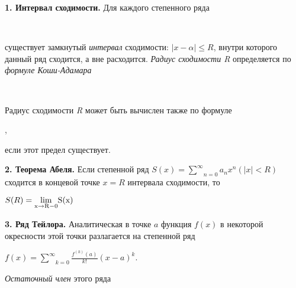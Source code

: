 \documentclass{book}
\begin{document}
\qquad \textbf {1. Интервал сходимости.} Для каждого степенного ряда\\

\begin{doublespace}
    \begin{centering} 
        \\
    \end{centering}
\end{doublespace}
существует замкнутый \emph{интервал} сходимости: \(|x - \alpha| \leqslant R\), внутри которого данный ряд сходится, а вне расходится. \emph{Радиус сходимости R} определяется по \emph{формуле Коши-Адамара}

\begin{centering} 
    \doublespacing {}\\
\end{centering}
Радиус сходимости \emph R может быть вычислен также по формуле\\
\begin{center}
    \centering {} , \\    
\end{center}
если этот предел существует.

\qquad \textbf{2. Теорема Абеля.} Если степенной ряд \(S(x) = \underset{n = 0}{\overset{\infty}{\sum}} a_nx^n (|x| < R)\) сходится в концевой точке \(x = R\) интервала сходимости, то \\
\begin{center}
    \(S(R) = \rm \underset{x \rightarrow R - 0}{lim}S(x)\)
\end{center}

\qquad \textbf{3. Ряд Тейлора.}  Аналитическая в точке \(a\) функция \(f(x)\) в некоторой окресности этой точки разлагается на степенной ряд \\

\begin{center}
    \(f(x) = \underset{k = 0}{\overset{\infty}{\sum}} \frac{f^{(k)}(a)}{k!}(x - a)^k\).
\end{center}

\emph{Остаточный член} этого ряда\\
\end{document}
